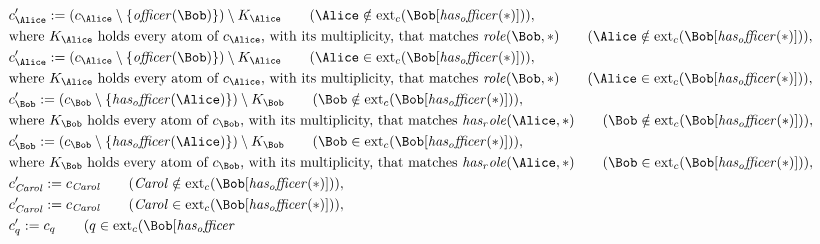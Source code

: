 \begin{align*}
&
c'_
{
\Alice
}
 := 
(c_
{
\Alice
}
 \setminus 
\{
\mathit{
officer
}
(
\Bob
)
\}
) \setminus K_
{
\Alice
}
 \qquad (
\Alice
 \notin 
\mathrm{ext}_c(
\Bob
[
\mathit{
has_officer
}
(
\ast
)
]
)
)
,\\
&
\text{where } K_
{
\Alice
}
 \text{ holds every atom of } c_
{
\Alice
}
 \text{, with its multiplicity, that matches } 
\mathit{
role
}
(
\Bob
,
\ast
)
 \qquad (
\Alice
 \notin 
\mathrm{ext}_c(
\Bob
[
\mathit{
has_officer
}
(
\ast
)
]
)
)
,\\
&
c'_
{
\Alice
}
 := 
(c_
{
\Alice
}
 \setminus 
\{
\mathit{
officer
}
(
\Bob
)
\}
) \setminus K_
{
\Alice
}
 \qquad (
\Alice
 \in 
\mathrm{ext}_c(
\Bob
[
\mathit{
has_officer
}
(
\ast
)
]
)
)
,\\
&
\text{where } K_
{
\Alice
}
 \text{ holds every atom of } c_
{
\Alice
}
 \text{, with its multiplicity, that matches } 
\mathit{
role
}
(
\Bob
,
\ast
)
 \qquad (
\Alice
 \in 
\mathrm{ext}_c(
\Bob
[
\mathit{
has_officer
}
(
\ast
)
]
)
)
,\\
&
c'_
{
\Bob
}
 := 
(c_
{
\Bob
}
 \setminus 
\{
\mathit{
has_officer
}
(
\Alice
)
\}
) \setminus K_
{
\Bob
}
 \qquad (
\Bob
 \notin 
\mathrm{ext}_c(
\Bob
[
\mathit{
has_officer
}
(
\ast
)
]
)
)
,\\
&
\text{where } K_
{
\Bob
}
 \text{ holds every atom of } c_
{
\Bob
}
 \text{, with its multiplicity, that matches } 
\mathit{
has_role
}
(
\Alice
,
\ast
)
 \qquad (
\Bob
 \notin 
\mathrm{ext}_c(
\Bob
[
\mathit{
has_officer
}
(
\ast
)
]
)
)
,\\
&
c'_
{
\Bob
}
 := 
(c_
{
\Bob
}
 \setminus 
\{
\mathit{
has_officer
}
(
\Alice
)
\}
) \setminus K_
{
\Bob
}
 \qquad (
\Bob
 \in 
\mathrm{ext}_c(
\Bob
[
\mathit{
has_officer
}
(
\ast
)
]
)
)
,\\
&
\text{where } K_
{
\Bob
}
 \text{ holds every atom of } c_
{
\Bob
}
 \text{, with its multiplicity, that matches } 
\mathit{
has_role
}
(
\Alice
,
\ast
)
 \qquad (
\Bob
 \in 
\mathrm{ext}_c(
\Bob
[
\mathit{
has_officer
}
(
\ast
)
]
)
)
,\\
&
c'_
{
\mathit{Carol}
}
 := 
c_
{
\mathit{Carol}
}
 \qquad (
\mathit{Carol}
 \notin 
\mathrm{ext}_c(
\Bob
[
\mathit{
has_officer
}
(
\ast
)
]
)
)
,\\
&
c'_
{
\mathit{Carol}
}
 := 
c_
{
\mathit{Carol}
}
 \qquad (
\mathit{Carol}
 \in 
\mathrm{ext}_c(
\Bob
[
\mathit{
has_officer
}
(
\ast
)
]
)
)
,\\
&
c'_
q
 := 
c_
q
 \qquad (
q
 \in 
\mathrm{ext}_c(
\Bob
[
\mathit{
has_officer
}

\end{align*}
